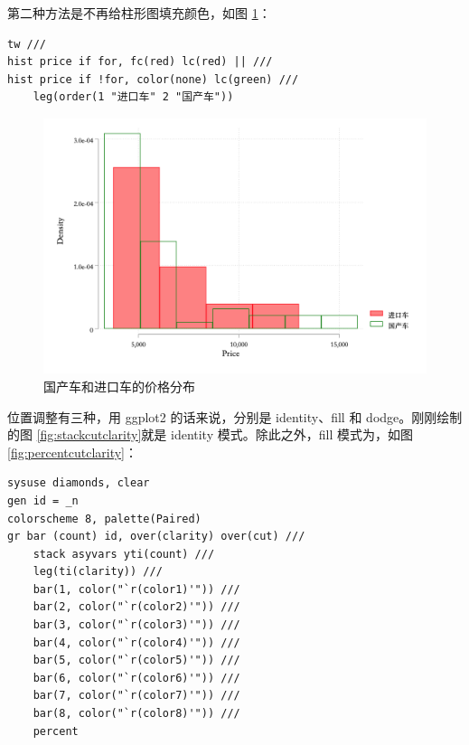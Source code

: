 第二种方法是不再给柱形图填充颜色，如图 \ref{fig:histautoprice3}：

\begin{lstlisting}
tw ///
hist price if for, fc(red) lc(red) || ///
hist price if !for, color(none) lc(green) ///
    leg(order(1 "进口车" 2 "国产车"))
\end{lstlisting}

\begin{figure}[htbp]
  \centering \includegraphics[width=\textwidth]{assets/histautoprice3.png}
  \caption{国产车和进口车的价格分布}\label{fig:histautoprice3}
\end{figure}

位置调整有三种，用 ggplot2 的话来说，分别是 \textcolor{third2}{identity}、\textcolor{third2}{fill} 和 \textcolor{third2}{dodge}。刚刚绘制的图 \ref{fig:stackcutclarity}就是 \textcolor{third2}{identity} 模式。除此之外，\textcolor{third2}{fill} 模式为，如图 \ref{fig:percentcutclarity}：

\begin{lstlisting}
sysuse diamonds, clear
gen id = _n
colorscheme 8, palette(Paired)
gr bar (count) id, over(clarity) over(cut) ///
    stack asyvars yti(count) ///
    leg(ti(clarity)) ///
    bar(1, color("`r(color1)'")) ///
    bar(2, color("`r(color2)'")) ///
    bar(3, color("`r(color3)'")) ///
    bar(4, color("`r(color4)'")) ///
    bar(5, color("`r(color5)'")) ///
    bar(6, color("`r(color6)'")) ///
    bar(7, color("`r(color7)'")) ///
    bar(8, color("`r(color8)'")) ///
    percent
\end{lstlisting}

